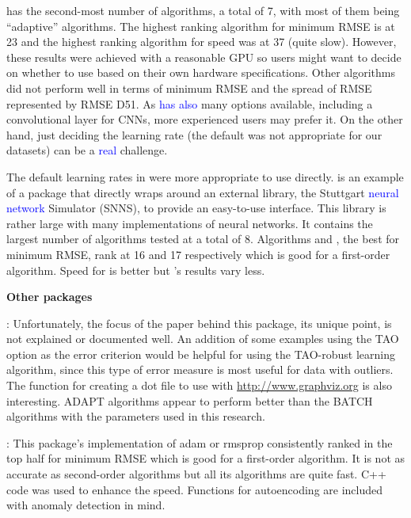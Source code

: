  has the second-most number of algorithms, a total of 7, with
most of them being ``adaptive'' algorithms. The highest ranking
algorithm for minimum RMSE is  at 23 and the highest
ranking algorithm for speed was  at 37 (quite slow).
However, these results were achieved with a reasonable GPU so users
might want to decide on whether to use  based on their own
hardware specifications. Other algorithms did not perform well in terms
of minimum RMSE and the spread of RMSE represented by RMSE D51. As
 \textcolor{blue}{has also} many options available, including
a convolutional layer for CNNs, more experienced users may prefer it. On
the other hand, just deciding the learning rate (the default was not
appropriate for our datasets) can be a \textcolor{blue}{real} challenge.

The default learning rates in  \citep{R-RSNNS} were more
appropriate to use directly.  is an example of a package that
directly wraps around an external library, the Stuttgart
\textcolor{blue}{neural network} Simulator (SNNS), to provide an
easy-to-use interface. This library is rather large with many
implementations of neural networks. It contains the largest number of
algorithms tested at a total of 8. Algorithms  and
, the best for minimum RMSE, rank at 16 and 17 respectively
which is good for a first-order algorithm. Speed for  is
better but 's results vary less.

\textbf{Other packages }

 \citep{R-AMORE}: Unfortunately, the focus of the paper
behind this package, its unique point, is not explained or documented
well. An addition of some examples using the TAO option as the error
criterion would be helpful for using the TAO-robust learning algorithm,
since this type of error measure is most useful for data with outliers.
The function for creating a dot file to use with
\url{http://www.graphviz.org} is also interesting. ADAPT algorithms
appear to perform better than the BATCH algorithms with the parameters
used in this research.

 \citep{R-ANN2}: This package's implementation of adam or
rmsprop consistently ranked in the top half for minimum RMSE which is
good for a first-order algorithm. It is not as accurate as second-order
algorithms but all its algorithms are quite fast. C++ code was used to
enhance the speed. Functions for autoencoding are included with anomaly
detection in mind.

